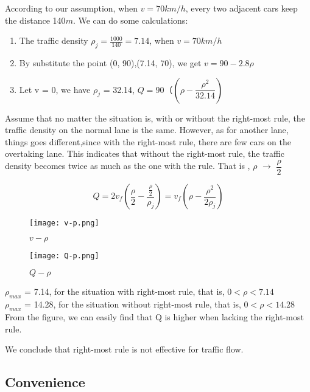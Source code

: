 According to our assumption, when $v = 70km/h$, every 
two adjacent cars keep the distance 140$m$. We can do
some calculations:
\begin{enumerate}
\item The traffic density 
$\rho_j = \frac{1000}{140} = 7.14$, when $v = 70km/h$
\item By substitute the point (0, 90),(7.14, 70), 
we get $v = 90 - 2.8 \rho$
\item Let v = 0, we have
$\rho_j$ = 32.14,
$Q = 90（(\rho - \dfrac{\rho ^2}{32.14})$
\end{enumerate}

Assume that no matter the situation is, with or without the 
right-most rule,
the traffic density on the normal lane is the same. However,
as for another lane, things goes different,since
with the right-most rule, there are few cars on the overtaking
lane. This indicates that without the right-most rule,
the traffic density becomes twice as much as the one with the
rule.
That is , $\rho$ $\rightarrow$ $\dfrac{\rho}{2}$

\begin{displaymath}
Q = 2v_f(\dfrac{\rho}{2} -\dfrac{\frac{\rho}{2}}{\rho_j})
= v_f(\rho - \dfrac{\rho^2}{2\rho _j})
\end{displaymath}

\begin{figure}
\centering
	\texttt{[image: v-p.png]}
\caption{$v - \rho$}
\end{figure}

\begin{figure}
\centering
	\texttt{[image: Q-p.png]}
	\caption{$Q-\rho$}
\end{figure}

$\rho_{max}$ = 7.14, for the situation with
right-most rule, that is, $ 0 < \rho < 7.14$\\
$\rho_{max}$ = 14.28, for the situation without
right-most rule, that is, $0 < \rho < 14.28$\\
From the figure, we can easily find that
Q is higher when lacking the right-most rule.

We conclude that right-most rule is not effective
for traffic flow.
 
\subsection{Convenience}

